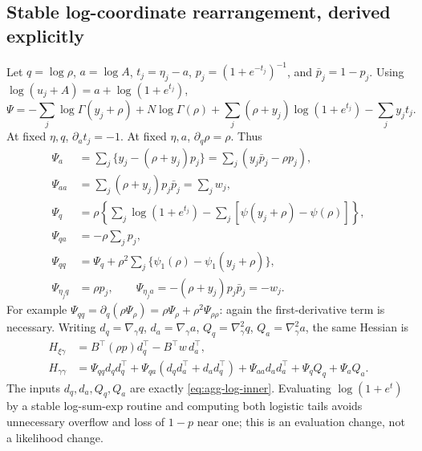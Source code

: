 \documentclass[11pt,a4paper]{article}
\numberwithin{equation}{section}
\begin{document}
\subsection{Stable log-coordinate rearrangement, derived explicitly}
Let $q=\log\rho$, $a=\log A$, $t_j=\eta_j-a$,
$p_j=(1+e^{-t_j})^{-1}$, and $\bar p_j=1-p_j$.
Using $\log(u_j+A)=a+\log(1+e^{t_j})$,
\begin{equation}
 \Psi=-\sum_j\log\Gamma(y_j+\rho)+N\log\Gamma(\rho)
            +\sum_j(\rho+y_j)\log(1+e^{t_j})-\sum_jy_jt_j.
 \label{eq:agg-logpsi}
\end{equation}
At fixed $\eta,q$, $\partial_a t_j=-1$.
At fixed $\eta,a$, $\partial_q\rho=\rho$.
Thus
\begin{align}
 \Psi_a&=\sum_j\{y_j-(\rho+y_j)p_j\}
                 =\sum_j(y_j\bar p_j-\rho p_j),\\
 \Psi_{aa}&=\sum_j(\rho+y_j)p_j\bar p_j=\sum_jw_j,\\
 \Psi_q&=\rho\left\{
       \sum_j\log(1+e^{t_j})-\sum_j[\psi(y_j+\rho)-\psi(\rho)]\right\},\\
 \Psi_{qa}&=-\rho\sum_jp_j,\\
 \Psi_{qq}&=\Psi_q+\rho^2\sum_j\{\psi_1(\rho)-\psi_1(y_j+\rho)\},\\
 \Psi_{\eta_jq}&=\rho p_j,\qquad
 \Psi_{\eta_ja}=-(\rho+y_j)p_j\bar p_j=-w_j.
 \label{eq:agg-logpartials}
\end{align}
For example $\Psi_{qq}=\partial_q(\rho\Psi_\rho)
=\rho\Psi_\rho+\rho^2\Psi_{\rho\rho}$: again the
first-derivative term is necessary.
Writing $d_q=\nabla_\gamma q$, $d_a=\nabla_\gamma a$,
$Q_q=\nabla_\gamma^2q$, $Q_a=\nabla_\gamma^2a$, the same Hessian is
\begin{align}
 H_{\xi\gamma}
 &=B^\top(\rho p)d_q^\top-B^\top w\,d_a^\top,\\
 H_{\gamma\gamma}
 &=\Psi_{qq}d_qd_q^\top
   +\Psi_{qa}(d_qd_a^\top+d_ad_q^\top)
   +\Psi_{aa}d_ad_a^\top+\Psi_qQ_q+\Psi_aQ_a.
 \label{eq:agg-stable-hessian}
\end{align}
The inputs $d_q,d_a,Q_q,Q_a$ are exactly
\eqref{eq:agg-log-inner}. Evaluating $\log(1+e^t)$ by a stable
log-sum-exp routine and computing both logistic tails avoids unnecessary
overflow and loss of $1-p$ near one; this is an evaluation change,
not a likelihood change.
\end{document}
